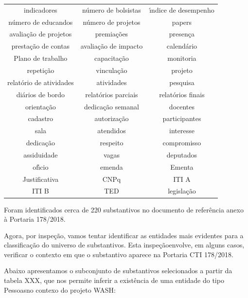 \documentclass[
12pt,		%
openright,	%
twoside,  %
a4paper,			%
chapter=TITLE,		%
english,			%
french,				%
spanish,			%
brazil				%
]{USPSC-classe/USPSC}
\begin{document}
\begin{table}[htb]
\begin{tabular}{|c|c|c|}
indicadores  &  n\'umero de bolsistas  &  \'{\i}ndice de desempenho \\
n\'umero de educandos  &  n\'umero de projetos  &  papers \\
avalia\c{c}\~ao de projetos  &  premia\c{c}\~oes  &  presen\c{c}a  \\
presta\c{c}\~ao de contas  &  avalia\c{c}\~ao de impacto  &  calend\'ario \\
Plano de trabalho  &  capacita\c{c}\~ao  &  monitoria \\
repeti\c{c}\~ao  &  vincula\c{c}\~ao  &  projeto \\
relat\'orio de atividades  &  atividades  &  pesquisa \\
di\'arios de bordo  &  relat\'orios parciais  &  relat\'orios finais \\
orienta\c{c}\~ao  &  dedica\c{c}\~ao semanal  &  docentes \\
cadastro  &  autoriza\c{c}\~ao  &  participantes \\
sala  &  atendidos  &  interesse \\
dedica\c{c}\~ao  &  respeito  &  compromisso \\
assiduidade  &  vagas  &  deputados \\
of\'{\i}cio  &  emenda  &  Ementa \\
Justificativa  &  CNPq  &  ITI A \\
ITI B  &  TED  &  legisla\c{c}\~ao \\
\hline
\end{tabular}
\end{table}


Foram identificados cerca de 220 substantivos no documento de refer\^encia anexo \`a Portaria 178/2018.


Agora, por inspe\c{c}\~ao, vamos tentar identificar as entidades mais evidentes para a classifica\c{c}\~ao do universo de substantivos. Esta \textquotedbl inspe\c{c}\~ao\textquotedbl  envolve, em alguns casos, verificar o contexto em que o substantivo aparece na Portaria CTI 178/2018.


Abaixo apresentamos o subconjunto de substantivos selecionados a partir da tabela XXX, que nos permite inferir a exist\^encia de uma entidade do tipo \textquotedbl Pessoas\textquotedbl  no contexo do projeto WASH:



\noindent\begin{center}\mbox{\centering{}}\end{center}
\end{document}
